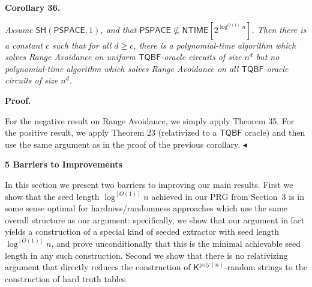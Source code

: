 

\par\medskip\noindent\textbf{
\textbf{Corollary 36}\textbf{.}
}\par



\emph{Assume $\mathsf{SH}({\mathsf{PSPACE}},1)$, and that ${\mathsf{PSPACE}}\not\subseteq{\mathsf{NTIME}}[2^{\log^{O(1)}n}]$. Then there is a constant $c$ such that for all $d\geq c$, there is a polynomial-time algorithm which solves Range Avoidance on uniform $\mathsf{TQBF}$-oracle circuits of size $n^{d}$ but no polynomial-time algorithm which solves Range Avoidance on all $\mathsf{TQBF}$-oracle circuits of size $n^{d}$.}\par







\par\medskip\noindent\textbf{Proof.}\par




For the negative result on Range Avoidance, we simply apply Theorem 35. For the positive result, we apply Theorem 23 (relativized to a $\mathsf{TQBF}$ oracle) and then use the same argument as in the proof of the previous corollary.
$\blacktriangleleft$\par







\par\medskip\noindent\textbf{
5 Barriers to Improvements}\par




In this section we present two barriers to improving our main results. First we show that the seed length $\log^{[O(1)]}n$ achieved in our PRG from Section 3 is in some sense optimal for hardness/randomness approaches which use the same overall structure as our argument: specifically, we show that our argument in fact yields a construction of a special kind of seeded extractor with seed length $\log^{[O(1)]}n$, and prove unconditionally that this is the minimal achievable seed length in any such construction. Second we show that there is no relativizing argument that directly reduces the construction of ${\mathsf{K}}^{\mathrm{poly}(n)}$-random strings to the construction of hard truth tables.\par




